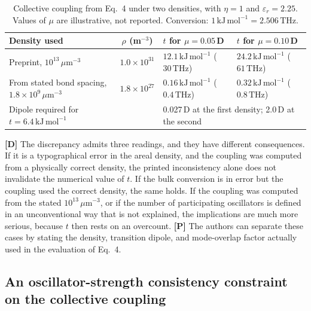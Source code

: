 \documentclass[11pt]{article}
\newcommand{\stD}{\textbf{\textcolor{green!40!black}{[D]}}}
\newcommand{\stP}{\textbf{\textcolor{violet!80!black}{[P]}}}
\newcommand{\thz}{\,\mathrm{THz}}
\newcommand{\kjm}{\,\mathrm{kJ\,mol^{-1}}}
\theoremstyle{plain}
\theoremstyle{definition}
\theoremstyle{remark}
\begin{document}
\begin{table}[ht]
\centering
\small
\begin{tabularx}{\textwidth}{@{}Xcll@{}}
\toprule
Density used & $\rho$ (m$^{-3}$) & $t$ for $\mu=0.05$\,D & $t$ for $\mu=0.10$\,D \\
\midrule
Preprint, $10^{13}\,\mu\mathrm{m}^{-3}$ & $1.0\times10^{31}$ & $12.1\kjm$ ($30\thz$) & $24.2\kjm$ ($61\thz$) \\
From stated bond spacing, $1.8\times10^{9}\,\mu\mathrm{m}^{-3}$ & $1.8\times10^{27}$ & $0.16\kjm$ ($0.4\thz$) & $0.32\kjm$ ($0.8\thz$) \\
\midrule
Dipole required for $t=6.4\kjm$ & & \multicolumn{2}{l}{0.027\,D at the first density; 2.0\,D at the second} \\
\bottomrule
\end{tabularx}
\caption{Collective coupling from Eq.~4 under two densities, with $\eta=1$ and $\varepsilon_r=2.25$. Values of $\mu$ are illustrative, not reported. Conversion: $1\kjm=2.506\thz$.}
\label{tab:dipole}
\end{table}

\stD{} The discrepancy admits three readings, and they have different consequences. If it is a typographical error in the areal density, and the coupling was computed from a physically correct density, the printed inconsistency alone does not invalidate the numerical value of $t$. If the bulk conversion is in error but the coupling used the correct density, the same holds. If the coupling was computed from the stated $10^{13}\,\mu\mathrm{m}^{-3}$, or if the number of participating oscillators is defined in an unconventional way that is not explained, the implications are much more serious, because $t$ then rests on an overcount. \stP{} The authors can separate these cases by stating the density, transition dipole, and mode-overlap factor actually used in the evaluation of Eq.~4.

\subsection{An oscillator-strength consistency constraint on the collective coupling}
\end{document}

